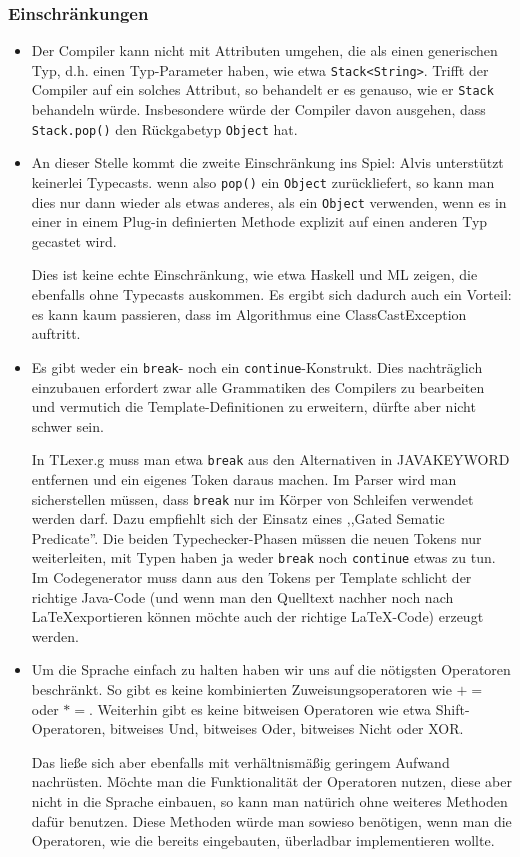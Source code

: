 \documentclass[10pt,a4paper,oneside]{scrbook}
\begin{document}
\subsubsection{Einschränkungen}
\begin{itemize}
  \item Der Compiler kann nicht mit Attributen umgehen, die als einen generischen Typ, d.h. einen Typ-Parameter haben, wie etwa \texttt{Stack<String>}.
    Trifft der Compiler auf ein solches Attribut, so behandelt er es genauso, wie er \texttt{Stack} behandeln würde.
    Insbesondere würde der Compiler davon ausgehen, dass \texttt{Stack.pop()} den Rückgabetyp \texttt{Object} hat.
  \item An dieser Stelle kommt die zweite Einschränkung ins Spiel: Alvis unterstützt keinerlei Typecasts. wenn also \texttt{pop()} ein \texttt{Object} zurückliefert, so kann man dies nur dann wieder als etwas anderes, als ein \texttt{Object} verwenden, wenn es in einer in einem Plug-in definierten Methode explizit auf einen anderen Typ gecastet wird.

    Dies ist keine echte Einschränkung, wie etwa Haskell und ML zeigen, die ebenfalls ohne Typecasts auskommen.
    Es ergibt sich dadurch auch ein Vorteil: es kann kaum passieren, dass im Algorithmus eine ClassCastException auftritt.
  \item Es gibt weder ein \texttt{break}- noch ein \texttt{continue}-Konstrukt.
    Dies nachträglich einzubauen erfordert zwar alle Grammatiken des Compilers zu bearbeiten und vermutich die Template-Definitionen zu erweitern, dürfte aber nicht schwer sein.

    In TLexer.g muss man etwa \texttt{break} aus den Alternativen in JAVAKEYWORD entfernen und ein eigenes Token daraus machen.
    Im Parser wird man sicherstellen müssen, dass \texttt{break} nur im Körper von Schleifen verwendet werden darf.
    Dazu empfiehlt sich der Einsatz eines ,,Gated Sematic Predicate''.
    Die beiden Typechecker-Phasen müssen die neuen Tokens nur weiterleiten, mit Typen haben ja weder \texttt{break} noch \texttt{continue} etwas zu tun.
    Im Codegenerator muss dann aus den Tokens per Template schlicht der richtige Java-Code (und wenn man den Quelltext nachher noch nach \LaTeX exportieren können möchte auch der richtige \LaTeX-Code) erzeugt werden.

   \item Um die Sprache einfach zu halten haben wir uns auf die nötigsten Operatoren beschränkt. So gibt es keine kombinierten Zuweisungsoperatoren wie $+=$ oder $*=$.
     Weiterhin gibt es keine bitweisen Operatoren wie etwa Shift-Operatoren, bitweises Und, bitweises Oder, bitweises Nicht oder XOR.

     Das ließe sich aber ebenfalls mit verhältnismäßig geringem Aufwand nachrüsten.
     Möchte man die Funktionalität der Operatoren nutzen, diese aber nicht in die Sprache einbauen, so kann man natürich ohne weiteres Methoden dafür benutzen.
     Diese Methoden würde man sowieso benötigen, wenn man die Operatoren, wie die bereits eingebauten, überladbar implementieren wollte.
\end{itemize}
\end{document}
